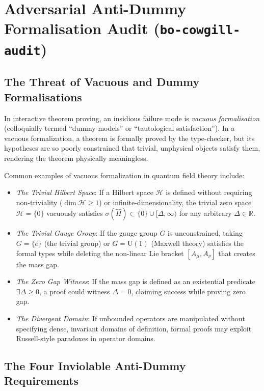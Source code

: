 \section{Adversarial Anti-Dummy Formalisation Audit (\texorpdfstring{\texttt{bo-cowgill-audit}}{bo-cowgill-audit})}
\label{sec:adversarial_audit}

\subsection{The Threat of Vacuous and Dummy Formalisations}
\label{subsec:vacuous_threat}

In interactive theorem proving, an insidious failure mode is \emph{vacuous formalisation} (colloquially termed ``dummy models'' or ``tautological satisfaction''). In a vacuous formalization, a theorem is formally proved by the type-checker, but its hypotheses are so poorly constrained that trivial, unphysical objects satisfy them, rendering the theorem physically meaningless. 

Common examples of vacuous formalization in quantum field theory include:
\begin{itemize}
    \item \emph{The Trivial Hilbert Space}: If a Hilbert space $\mathcal{H}$ is defined without requiring non-triviality ($\dim \mathcal{H} \ge 1$) or infinite-dimensionality, the trivial zero space $\mathcal{H} = \{0\}$ vacuously satisfies $\sigma(\hat{H}) \subset \{0\} \cup [\Delta, \infty)$ for any arbitrary $\Delta \in \mathbb{R}$.
    \item \emph{The Trivial Gauge Group}: If the gauge group $G$ is unconstrained, taking $G = \{e\}$ (the trivial group) or $G = \mathrm{U}(1)$ (Maxwell theory) satisfies the formal types while deleting the non-linear Lie bracket $[A_\mu, A_\nu]$ that creates the mass gap.
    \item \emph{The Zero Gap Witness}: If the mass gap is defined as an existential predicate $\exists \Delta \ge 0$, a proof could witness $\Delta = 0$, claiming success while proving zero gap.
    \item \emph{The Divergent Domain}: If unbounded operators are manipulated without specifying dense, invariant domains of definition, formal proofs may exploit Russell-style paradoxes in operator domains.
\end{itemize}

\subsection{The Four Inviolable Anti-Dummy Requirements}
\label{subsec:four_anti_dummy_requirements}

